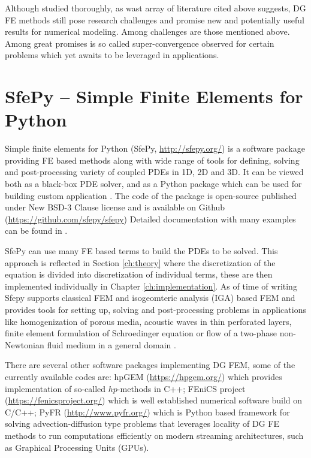 Although studied thoroughly, as wast array of literature cited above suggests, DG FE 
methods still pose research challenges and promise new and potentially useful results for 
numerical modeling. Among challenges are those mentioned above. Among great promises is 
so called super-convergence observed for certain problems \cite{Roe2017} which yet awaits 
to be leveraged in applications.


\section{SfePy -- Simple Finite Elements for Python}

Simple finite elements for Python (SfePy, 
\url{http://sfepy.org/}) is a software 
package providing FE based methods along with wide range of tools for defining, solving 
and post-processing variety of coupled PDEs in 1D, 2D and 3D. It can be viewed both as a 
black-box PDE solver, and as a Python package which can be used for building custom 
application \cite{Cimrman_Lukes_Rohan_2019}. The code of the package is open-source 
published under New BSD-3 Clause license \cite{bsd3-lic} and is available on Github 
(\url{https://github.com/sfepy/sfepy}) %
Detailed documentation with many examples can be found in 
\cite{sfepy-doc}.

SfePy can use many FE based terms to 
build the PDEs to be solved. This approach is reflected in Section \ref{ch:theory}
where the discretization of the equation is divided into discretization of individual 
terms, these are then implemented individually in Chapter \ref{ch:implementation}. As of 
time of writing Sfepy supports classical FEM and isogeomteric analysis (IGA) based FEM 
and 
provides tools for setting up, solving and post-processing problems in applications like 
homogenization of porous media, acoustic waves in thin perforated layers,  finite element 
formulation of Schroedinger equation or flow of a two-phase non-Newtonian fluid medium in 
a general domain \cite{Cimrman_Lukes_Rohan_2019}.

There are several other software packages implementing  DG FEM, some of the currently 
available codes are:
hpGEM \cite{hpgem2007} (\url{https://hpgem.org/}) which provides implementation of 
so-called $hp$-methods in C++; 
FEniCS project \cite{fenics2015} (\url{https://fenicsproject.org/}) which is well 
established numerical software build on C/C++;
PyFR \cite{pyfr2014} (\url{http://www.pyfr.org/}) which is  Python based framework for 
solving advection-diffusion type problems that leverages locality of DG FE methods to run 
computations efficiently on modern streaming architectures, such as Graphical 
Processing Units (GPUs).







